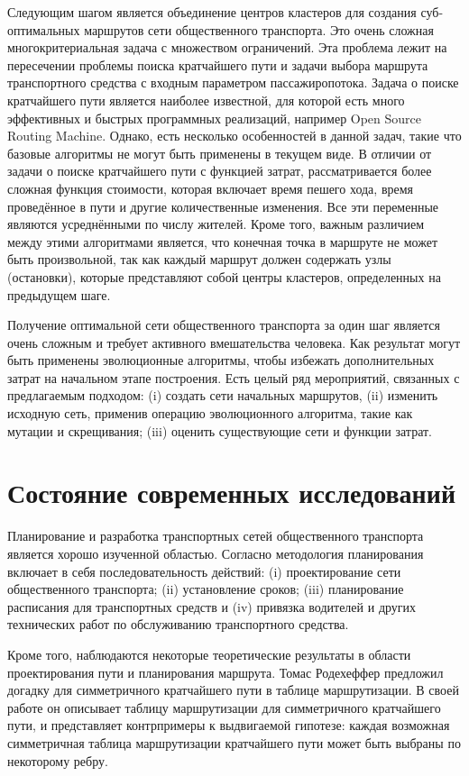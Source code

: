 Следующим шагом является объединение центров кластеров для создания суб- оптимальных маршрутов сети 
общественного транспорта. Это очень сложная многокритериальная задача с множеством ограничений. Эта проблема 
лежит на пересечении проблемы поиска кратчайшего пути и задачи выбора маршрута транспортного средства с 
входным параметром пассажиропотока. Задача о поиске кратчайшего пути является наиболее известной, для которой 
есть много эффективных и быстрых программных реализаций, например Open Source Routing Machine\cite{osrm}. 
Однако, есть несколько особенностей в данной задач, такие что базовые алгоритмы не могут быть применены в 
текущем виде. В отличии от задачи о поиске кратчайшего пути с функцией затрат, рассматривается более сложная 
функция стоимости, которая включает время пешего хода, время проведённое в пути и другие количественные 
изменения. Все эти переменные являются усреднёнными по числу жителей. Кроме того, важным различием между этими 
алгоритмами является, что конечная точка в маршруте не может быть произвольной, так как каждый маршрут должен 
содержать узлы (остановки), которые представляют собой центры кластеров, определенных на предыдущем шаге.

Получение оптимальной сети общественного транспорта за один шаг является очень сложным и требует активного 
вмешательства человека. Как результат могут быть применены эволюционные алгоритмы, чтобы избежать дополнительных 
затрат на начальном этапе построения. Есть целый ряд мероприятий, связанных с предлагаемым подходом: (i) 
создать сети начальных маршрутов, (ii) изменить исходную сеть, применив операцию эволюционного алгоритма, 
такие как мутации и скрещивания; (iii) оценить существующие сети и функции затрат.

\section{Состояние современных исследований}
Планирование и разработка транспортных сетей общественного транспорта является хорошо изученной областью.
Согласно \cite{ceder2007} методология планирования включает в себя последовательность действий: 
(i) проектирование сети общественного транспорта; (ii) установление сроков; (iii) планирование расписания 
для транспортных средств и (iv) привязка водителей и других технических работ по обслуживанию транспортного 
средства.

Кроме того, наблюдаются некоторые теоретические результаты в области проектирования пути и планирования 
маршрута. Томас Родехеффер предложил догадку для симметричного кратчайшего пути в таблице маршрутизации. 
В своей работе \cite{rodeheffer2013symmetric} он описывает таблицу маршрутизации для симметричного кратчайшего 
пути, и представляет контрпримеры к выдвигаемой гипотезе: каждая возможная симметричная таблица маршрутизации 
кратчайшего пути может быть выбраны по некоторому ребру.

